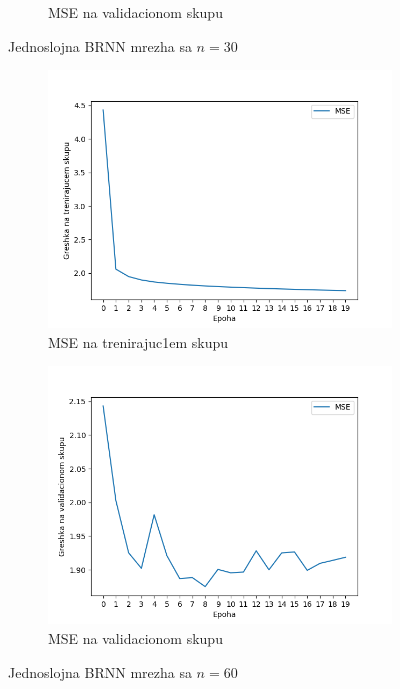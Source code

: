 \documentclass[a4paper, openany, oneside, 11pt]{book}
\begin{document}
\begin{figure}[!h]
\begin{subfigure}{0.475\textwidth}
            \caption{\acrshort{MSE} na validacionom skupu}
            \label{fig:4_6b}
            \vspace{0pt}
        \end{subfigure}
        \caption{Jednoslojna \acrshort{BRNN} mrezha sa $n=30$}
        \label{fig:4_6}
\end{figure}
\begin{figure}[!h]
        \centering
        \begin{subfigure}{0.475\textwidth}
            \centering
            \includegraphics[scale=0.45]{res/SL_BLSTM_60units_d00_train.png}
            \caption{\acrshort{MSE} na trenirajuc1em skupu}
            \label{fig:4_7a}
            \vspace{0pt}
        \end{subfigure}%
        \begin{subfigure}{0.475\textwidth}
            \centering
            \includegraphics[scale=0.45]{res/SL_BLSTM_60units_d00_validation.png}
            \caption{\acrshort{MSE} na validacionom skupu}
            \label{fig:4_7b}
            \vspace{0pt}
        \end{subfigure}
        \caption{Jednoslojna \acrshort{BRNN} mrezha sa $n=60$}
        \label{fig:4_7}
\end{figure}
\end{document}
